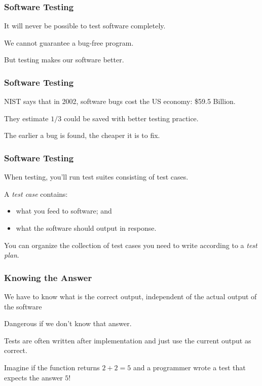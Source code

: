 \begin{frame}
\frametitle{Software Testing}
\begin{changemargin}{1cm}
It will never be possible to test software completely.

We cannot guarantee a bug-free program.

But testing makes our software better.

\end{changemargin}
\end{frame}


\begin{frame}
\frametitle{Software Testing}
\begin{changemargin}{1cm}
NIST says that in 2002, software bugs cost the US economy: \$59.5 Billion.

They estimate $1/3$ could be saved with better testing practice.

The earlier a bug is found, the cheaper it is to fix.

\end{changemargin}
\end{frame}

\begin{frame}
\frametitle{Software Testing}
\begin{changemargin}{1cm}

When testing, you'll run \alert{test suites} consisting of \alert{test
  cases}.

A \emph{test case} contains:
\begin{itemize}
\item what you feed to software; and
\item what the software should output in response.  
\end{itemize} 

You can organize the collection of test cases you need to write
according to a \emph{test plan}.

\end{changemargin}
\end{frame}

\begin{frame}
\frametitle{Knowing the Answer}
\begin{changemargin}{1cm}
We have to know what is the correct output, independent of the actual output of the software

Dangerous if we don't know that answer.

Tests are often written after implementation and just use the current output as correct.

Imagine if the function returns $2 + 2 = 5$ and a programmer wrote a test that expects the answer $5$!

\end{changemargin}
\end{frame}


